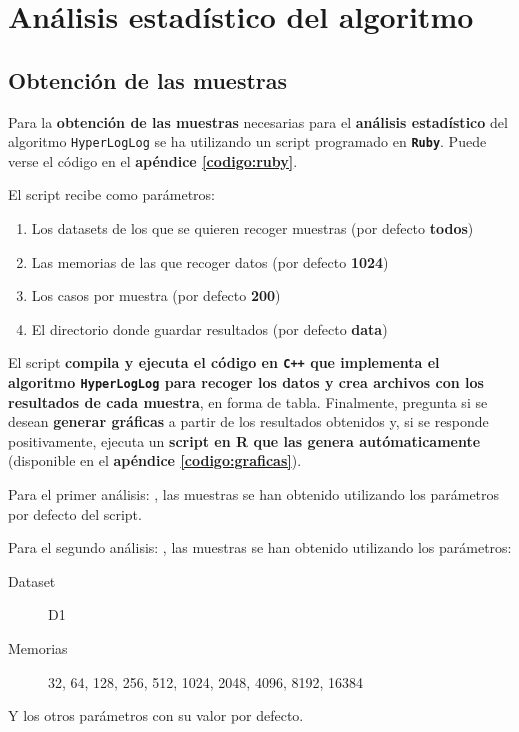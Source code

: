 % 
\section{Análisis estadístico del algoritmo}
\label{analisis}

\subsection{Obtención de las muestras}
Para la \textbf{obtención de las muestras} necesarias para el \textbf{análisis estadístico} del algoritmo \texttt{HyperLogLog}
se ha utilizando un script programado en \textbf{\texttt{Ruby}}. Puede verse el código en el \textbf{apéndice \ref{codigo:ruby}}.

El script recibe como parámetros:
\begin{enumerate}
\item Los datasets de los que se quieren recoger muestras (por defecto \textbf{todos})
\item Las memorias de las que recoger datos (por defecto \textbf{1024})
\item Los casos por muestra (por defecto \textbf{200})
\item El directorio donde guardar resultados (por defecto \textbf{data})
\end{enumerate}

El script \textbf{compila y ejecuta el código en \texttt{C++} que implementa el algoritmo \texttt{HyperLogLog} para recoger los datos
y crea archivos con los resultados de cada muestra}, en forma de tabla. Finalmente, pregunta si se desean
\textbf{generar gráficas} a partir de los resultados obtenidos y, si se responde positivamente, ejecuta un \textbf{script en R que las genera autómaticamente} (disponible en el \textbf{apéndice \ref{codigo:graficas}}).

Para el primer análisis: \textbf{}, las muestras se han obtenido utilizando los parámetros por defecto del script.

Para el segundo análisis: \textbf{}, las muestras se han obtenido utilizando los parámetros:
\begin{description}
\item[Dataset] D1
\item[Memorias] 32, 64, 128, 256, 512, 1024, 2048, 4096, 8192, 16384
\end{description}

Y los otros parámetros con su valor por defecto.

